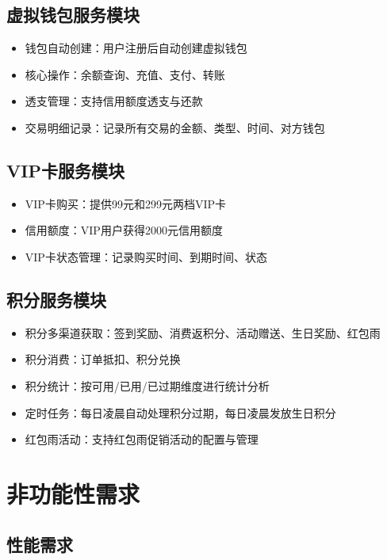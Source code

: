 \subsection{虚拟钱包服务模块}

\begin{itemize}
	\item 钱包自动创建：用户注册后自动创建虚拟钱包
	\item 核心操作：余额查询、充值、支付、转账
	\item 透支管理：支持信用额度透支与还款
	\item 交易明细记录：记录所有交易的金额、类型、时间、对方钱包
\end{itemize}

\subsection{VIP卡服务模块}

\begin{itemize}
	\item VIP卡购买：提供99元和299元两档VIP卡
	\item 信用额度：VIP用户获得2000元信用额度
	\item VIP卡状态管理：记录购买时间、到期时间、状态
\end{itemize}

\subsection{积分服务模块}

\begin{itemize}
	\item 积分多渠道获取：签到奖励、消费返积分、活动赠送、生日奖励、红包雨
	\item 积分消费：订单抵扣、积分兑换
	\item 积分统计：按可用/已用/已过期维度进行统计分析
	\item 定时任务：每日凌晨自动处理积分过期，每日凌晨发放生日积分
	\item 红包雨活动：支持红包雨促销活动的配置与管理
\end{itemize}

\section{非功能性需求}

\subsection{性能需求}

